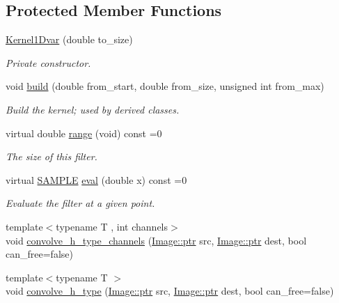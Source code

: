 \subsection*{Protected Member Functions}
\begin{DoxyCompactItemize}
\item 
\hyperlink{class_photo_finish_1_1_kernel1_dvar_ae931da40a0626469cac882022b7c54da}{Kernel1\+Dvar} (double to\+\_\+size)
\begin{DoxyCompactList}\small\item\em Private constructor. \end{DoxyCompactList}\item 
void \hyperlink{class_photo_finish_1_1_kernel1_dvar_a6bc546480c5f4ccac586b69ef1b9e6dc}{build} (double from\+\_\+start, double from\+\_\+size, unsigned int from\+\_\+max)
\begin{DoxyCompactList}\small\item\em Build the kernel; used by derived classes. \end{DoxyCompactList}\item 
virtual double \hyperlink{class_photo_finish_1_1_kernel1_dvar_a2d7bfe24194daebaf5ba37b561df73cc}{range} (void) const =0
\begin{DoxyCompactList}\small\item\em The size of this filter. \end{DoxyCompactList}\item 
virtual \hyperlink{sample_8h_afc597c76b4f04a2da506a240d51d89a0}{S\+A\+M\+P\+LE} \hyperlink{class_photo_finish_1_1_kernel1_dvar_a2d6115c261194c714d254e095a557ecc}{eval} (double x) const =0
\begin{DoxyCompactList}\small\item\em Evaluate the filter at a given point. \end{DoxyCompactList}\item 
{\footnotesize template$<$typename T , int channels$>$ }\\void \hyperlink{class_photo_finish_1_1_kernel1_dvar_a1cad3fb4a39faa44c4b66ea325e648a6}{convolve\+\_\+h\+\_\+type\+\_\+channels} (\hyperlink{class_photo_finish_1_1_image_ab336203305ed3a1397d7245063353b5a}{Image\+::ptr} src, \hyperlink{class_photo_finish_1_1_image_ab336203305ed3a1397d7245063353b5a}{Image\+::ptr} dest, bool can\+\_\+free=false)
\item 
{\footnotesize template$<$typename T $>$ }\\void \hyperlink{class_photo_finish_1_1_kernel1_dvar_a2ab889fb58b80f3cbb0dd0822c6034e5}{convolve\+\_\+h\+\_\+type} (\hyperlink{class_photo_finish_1_1_image_ab336203305ed3a1397d7245063353b5a}{Image\+::ptr} src, \hyperlink{class_photo_finish_1_1_image_ab336203305ed3a1397d7245063353b5a}{Image\+::ptr} dest, bool can\+\_\+free=false)

\end{DoxyCompactItemize}
